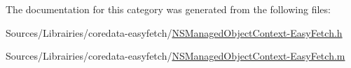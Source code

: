 The documentation for this category was generated from the following files\-:\begin{DoxyCompactItemize}
\item 
Sources/\-Librairies/coredata-\/easyfetch/\hyperlink{_n_s_managed_object_context-_easy_fetch_8h}{N\-S\-Managed\-Object\-Context-\/\-Easy\-Fetch.\-h}\item 
Sources/\-Librairies/coredata-\/easyfetch/\hyperlink{_n_s_managed_object_context-_easy_fetch_8m}{N\-S\-Managed\-Object\-Context-\/\-Easy\-Fetch.\-m}\end{DoxyCompactItemize}
